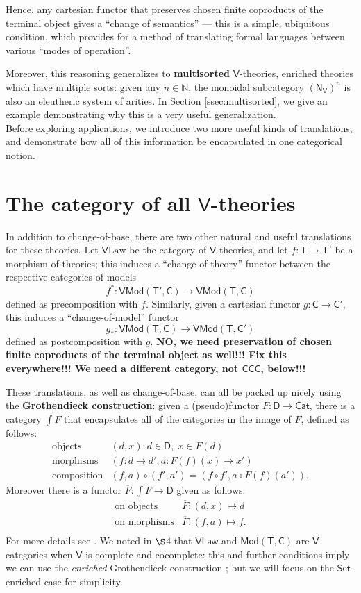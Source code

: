 \documentclass{amsart}
\theoremstyle{definition}
\newcommand{\Set}{\mathsf{Set}}
\newcommand{\Cat}{\mathsf{Cat}}
\newcommand{\Law}{\mathsf{Law}}
\newcommand{\CCC}{\mathsf{CCC}}
\newcommand{\Mod}{\mathsf{Mod}}
\newcommand{\NN}{\mathsf{N}}
\newcommand{\V}{\mathsf{V}}
\newcommand{\D}{\mathsf{D}}
\newcommand{\C}{\mathsf{C}}
\newcommand{\T}{\mathsf{T}}
\newcommand{\maps}{\colon}
\begin{document}
Hence, any cartesian functor that preserves chosen finite coproducts of the terminal object gives a ``change of semantics'' --- this is a simple, ubiquitous condition, which provides for a method of translating formal languages between various ``modes of operation''.

Moreover, this reasoning generalizes to \textbf{multisorted} $\V$-theories, enriched theories which have multiple sorts: given any $n\in \mathbb{N}$, the monoidal subcategory $(\NN_\V)^n$ is also an eleutheric system of arities.   In Section \ref{ssec:multisorted}, we give an example demonstrating why this is a very useful generalization.\\

Before exploring applications, we introduce two more useful kinds of translations, and demonstrate how all of this information be encapsulated in one categorical notion.

\section{The category of all $\V$-theories}

In addition to change-of-base, there are two other natural and useful translations for these theories. Let $\V\mathrm{Law}$ be the category of $\V$-theories, and let $f\maps\T\to \T'$ be a morphism of theories; this induces a ``change-of-theory'' functor between the respective categories of models $$f^*\maps\V\Mod(\T',\C)\to \V\Mod(\T,\C)$$ defined as precomposition with $f$. Similarly, given a cartesian functor $g\maps \C \to \C'$, this induces a ``change-of-model'' functor $$g_*\maps\V\Mod(\T,\C) \to \V\Mod(\T,\C')$$ defined as postcomposition with $g$.   \textbf{NO, we need preservation of chosen finite coproducts of the terminal object as well!!!  Fix this everywhere!!!  We need a different category, not $\CCC$, below!!!}

These translations, as well as change-of-base, can all be packed up nicely using the \textbf{Grothendieck construction}: given a (pseudo)functor $F\maps \D \to \Cat$, there is a category $\int F$ that encapsulates all of the categories in the image of $F$, defined
as follows:
\[\begin{array}{rl}
\text{objects} & (d,x) \colon d\in \D, \; x\in F(d)\\
\text{morphisms} & (f\maps d\to d',a\maps F(f)(x)\to x')\\
\text{composition} & (f,a) \circ (f',a') = (f \circ f', a \circ F(f)(a')).
\end{array}\]
Moreover there is a functor $\overline{F} \maps \int F \to \D$ given as follows:
\[\begin{array}{rl}
\text{on objects} & \overline{F} \maps (d,x) \mapsto d \\
\text{on morphisms} & \overline{F} \maps (f,a) \mapsto f .\\
\end{array}\]
For more details see \cite{borceux,jacobs}.  We noted in $\S$4 that $\V\Law$ and $\Mod(\T,\C)$ are $\V$-categories when $\V$ is complete and cocomplete: this and further conditions imply we can use the \textit{enriched} Grothendieck construction \cite{beardsleywong}; but we will focus on the $\Set$-enriched case for simplicity. 
\end{document}
